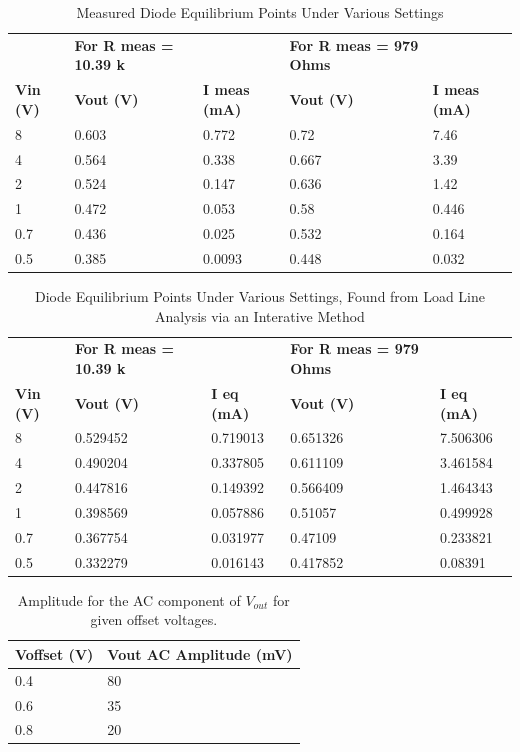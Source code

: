 \documentclass{article}
\begin{document}
    \begin{table}[H]
\centering
\caption{Measured Diode Equilibrium Points Under Various Settings}
\label{my-label}
\begin{tabular}{l|ll|ll}
\textbf{} & \textbf{For R meas = 10.39 k} & \textbf{} & \textbf{For R meas = 979 Ohms} & \textbf{} \\ \cline{2-5} 
\textbf{Vin (V)} & \textbf{Vout (V)} & \textbf{I meas (mA)} & \textbf{Vout (V)} & \textbf{I meas (mA)} \\
8 & 0.603 & 0.772 & 0.72 & 7.46 \\
4 & 0.564 & 0.338 & 0.667 & 3.39 \\
2 & 0.524 & 0.147 & 0.636 & 1.42 \\
1 & 0.472 & 0.053 & 0.58 & 0.446 \\
0.7 & 0.436 & 0.025 & 0.532 & 0.164 \\
0.5 & 0.385 & 0.0093 & 0.448 & 0.032
\end{tabular}
\end{table}
    \begin{table}[H]
\centering
\caption{Diode Equilibrium Points Under Various Settings, Found from Load Line Analysis via an Interative Method}
\label{my-label}
\begin{tabular}{l|ll|ll}
\textbf{} & \textbf{For R meas = 10.39 k} & \textbf{} & \textbf{For R meas = 979 Ohms} & \textbf{} \\ \cline{1-2} \cline{4-4}
\textbf{Vin (V)} & \textbf{Vout (V)} & \textbf{I eq (mA)} & \textbf{Vout (V)} & \textbf{I eq (mA)} \\ \hline
8 & 0.529452 & 0.719013 & 0.651326 & 7.506306 \\
4 & 0.490204 & 0.337805 & 0.611109 & 3.461584 \\
2 & 0.447816 & 0.149392 & 0.566409 & 1.464343 \\
1 & 0.398569 & 0.057886 & 0.51057 & 0.499928 \\
0.7 & 0.367754 & 0.031977 & 0.47109 & 0.233821 \\
0.5 & 0.332279 & 0.016143 & 0.417852 & 0.08391
\end{tabular}
\end{table}
    \begin{table}[H]
\centering
\caption{Amplitude for the AC component of $V_{out}$ for given offset voltages.}
\label{my-label}
\begin{tabular}{ll}
\textbf{Voffset (V)} & \textbf{Vout AC Amplitude (mV)} \\ \hline
0.4 & 80 \\
0.6 & 35 \\
0.8 & 20
\end{tabular}
\end{table}
\end{document}
